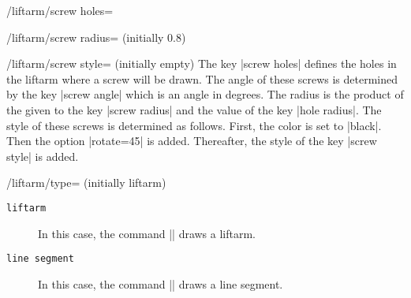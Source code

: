 \documentclass[a4paper,english,dvipsnames]{ltxdoc}
\begin{document}
\begin{command}{\liftarm{}}
\begin{key}{/liftarm/screw holes=}
\end{key}
\begin{key}{/liftarm/screw radius= (initially 0.8)}
\end{key}
\begin{stylekey}{/liftarm/screw style= (initially \normalfont empty)}
The key |screw holes| defines the holes in the liftarm where a screw will be drawn. The angle of these screws is determined by the key |screw angle| which is an angle in degrees. The radius is the product of the  given to the key |screw radius| and the value of the key |hole radius|. The style of these screws is determined as follows. First, the color is set to |black|. Then the option |rotate=45| is added. Thereafter, the style of the key |screw style| is added.
\begin{codeexample}[width=10cm]
\end{codeexample}
\end{stylekey}
\begin{key}{/liftarm/type= (initially liftarm)}
\begin{description}
\item[\texttt{liftarm}] In this case, the command |\liftarm| draws a liftarm.
\item[\texttt{line segment}] In this case, the command |\liftarm| draws a line segment.
\end{description}
\end{key}
\end{command}
\end{document}
